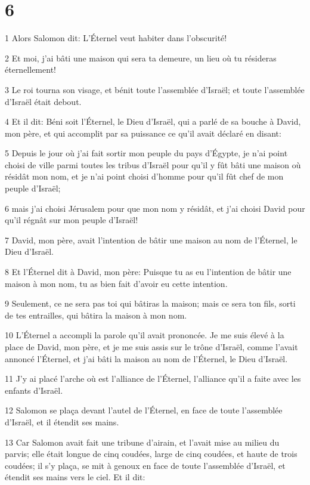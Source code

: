 \chapter{6}

\par 1 Alors Salomon dit: L'Éternel veut habiter dans l'obscurité!
\par 2 Et moi, j'ai bâti une maison qui sera ta demeure, un lieu où tu résideras éternellement!
\par 3 Le roi tourna son visage, et bénit toute l'assemblée d'Israël; et toute l'assemblée d'Israël était debout.
\par 4 Et il dit: Béni soit l'Éternel, le Dieu d'Israël, qui a parlé de sa bouche à David, mon père, et qui accomplit par sa puissance ce qu'il avait déclaré en disant:
\par 5 Depuis le jour où j'ai fait sortir mon peuple du pays d'Égypte, je n'ai point choisi de ville parmi toutes les tribus d'Israël pour qu'il y fût bâti une maison où résidât mon nom, et je n'ai point choisi d'homme pour qu'il fût chef de mon peuple d'Israël;
\par 6 mais j'ai choisi Jérusalem pour que mon nom y résidât, et j'ai choisi David pour qu'il régnât sur mon peuple d'Israël!
\par 7 David, mon père, avait l'intention de bâtir une maison au nom de l'Éternel, le Dieu d'Israël.
\par 8 Et l'Éternel dit à David, mon père: Puisque tu as eu l'intention de bâtir une maison à mon nom, tu as bien fait d'avoir eu cette intention.
\par 9 Seulement, ce ne sera pas toi qui bâtiras la maison; mais ce sera ton fils, sorti de tes entrailles, qui bâtira la maison à mon nom.
\par 10 L'Éternel a accompli la parole qu'il avait prononcée. Je me suis élevé à la place de David, mon père, et je me suis assis sur le trône d'Israël, comme l'avait annoncé l'Éternel, et j'ai bâti la maison au nom de l'Éternel, le Dieu d'Israël.
\par 11 J'y ai placé l'arche où est l'alliance de l'Éternel, l'alliance qu'il a faite avec les enfants d'Israël.
\par 12 Salomon se plaça devant l'autel de l'Éternel, en face de toute l'assemblée d'Israël, et il étendit ses mains.
\par 13 Car Salomon avait fait une tribune d'airain, et l'avait mise au milieu du parvis; elle était longue de cinq coudées, large de cinq coudées, et haute de trois coudées; il s'y plaça, se mit à genoux en face de toute l'assemblée d'Israël, et étendit ses mains vers le ciel. Et il dit:
